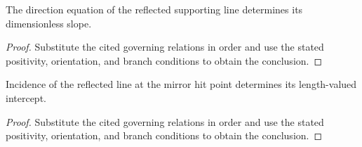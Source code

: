 \begin{lemma}
  \label{lem:physics:IPhO_2026_2_C_1:aux019}
  The direction equation of the reflected supporting line determines its dimensionless slope.
\end{lemma}
\begin{proof}
  Substitute the cited governing relations in order and use the stated positivity, orientation, and branch conditions to obtain the conclusion.
\end{proof}

\begin{lemma}
  \label{lem:physics:IPhO_2026_2_C_1:aux020}
  Incidence of the reflected line at the mirror hit point determines its length-valued intercept.
\end{lemma}
\begin{proof}
  Substitute the cited governing relations in order and use the stated positivity, orientation, and branch conditions to obtain the conclusion.
\end{proof}
